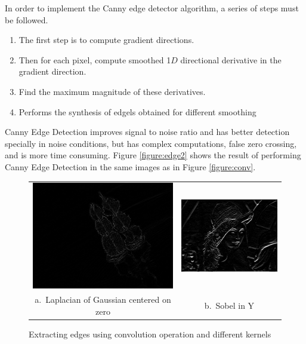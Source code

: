\documentclass[]{IEEEtran}
\begin{document}
  In order to implement the Canny edge detector algorithm, a series of steps must be followed.
  \begin{enumerate}
      \item The first step is to compute gradient directions.
      \item Then for each pixel, compute smoothed 1$D$ directional derivative in the gradient direction. 
      \item Find the maximum magnitude of these derivatives.
      \item Performs the synthesis of edgels obtained for different smoothing
  \end{enumerate}
  
  Canny Edge Detection improves signal to noise ratio and has better detection specially in noise conditions, but has complex computations, false zero crossing, and is more time consuming\cite{b4}. Figure \ref{figure:edge2} shows the result of performing Canny Edge Detection in the same images as in Figure \ref{figure:conv}.
  
    \begin{figure}[tb]
      \centering
      \begin{tabular}{c c}
      \includegraphics[width=0.35\linewidth]{./figures/3/lake-3-2-1-1.jpg} &
      \includegraphics[width=0.35\linewidth]{./figures/3/lena-3-2-1-2.jpg} \\
      a.~Laplacian of Gaussian centered on zero & b.~Sobel in Y
      \end{tabular}
      \caption{Extracting edges using convolution operation and different kernels}
      \label{figure:edge1}
    \end{figure}
  
\end{document}
